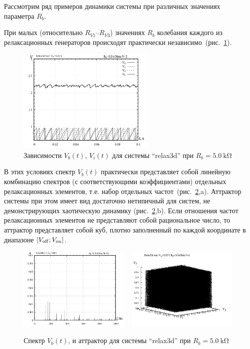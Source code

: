 Рассмотрим ряд примеров динамики системы
при различных значениях параметра $R_b$.

При малых (относительно $R_{V1}$--$R_{V3}$)
значениях $R_b$
колебания каждого из релаксационных генераторов
происходят практически независимо~(рис.~\ref{atu:f:relax3d_t_02}).

\begin{figure}[htb!]
  \centerline{\includegraphics[width=0.6\textwidth]{p/relax3d_t_02.png} }
  \caption{Зависимости $V_b(t)$, $V_i(t)$ для системы ``relax3d'' при $R_b=\SI{5.0}{\kilo\ohm}$ }
  \label{atu:f:relax3d_t_02}
\end{figure}

В этих условиях спектр $V_b(t)$ практически представляет собой линейную комбинацию спектров
(с соответствующими коэффициентами) отдельных релаксационных
элементов, т.е. набор отдельных частот~(рис.~\ref{atu:f:relax3d_f_02},a).
Аттрактор системы при этом имеет вид достаточно нетипичный для
систем, не демонстрирующих хаотическую динамику (рис.~\ref{atu:f:relax3d_f_02},b).
Если отношения частот релаксационных элементов
не представляют собой рациональное число, то аттрактор
представляет собой куб, плотно заполненный по каждой координате в
диапазоне $[ V_\mathrm{off} ; V_\mathrm{on} ] $.


\begin{figure}[htb!]
  \centerline{
    \includegraphics[width=0.48\textwidth]{p/relax3d_f_02.png}
    ~
    \includegraphics[width=0.48\textwidth]{p/relax3d_v1v2v3_02.png}
  }
  \caption{Спектр $V_b(t)$, и аттрактор для системы ``relax3d'' при $R_b=\SI{5.0}{\kilo\ohm}$ }
  \label{atu:f:relax3d_f_02}
\end{figure}


